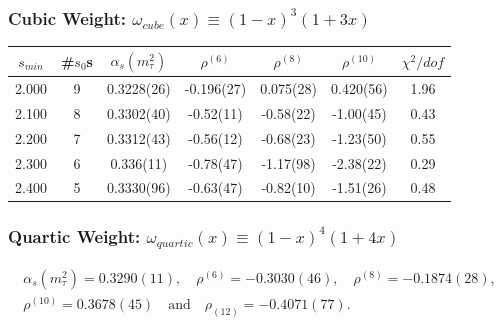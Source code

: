 \documentclass[fleqn]{beamer}
\begin{document}
\begin{frame}
  \frametitle{Cubic Weight: \(\omega_{cube}(x) \equiv (1-x)^3(1+3x)\)}
  \begin{tabular}{ccccccc}
    \toprule
    \(s_{min}\) & \#\(s_0\)s & \(\alpha_s(m_\tau^2)\) & \(\rho^{(6)}\) & \(\rho^{(8)}\) & \(\rho^{(10)}\) & \(\chi^2/dof\)  \\
    \midrule
    2.000 & 9 & 0.3228(26) & -0.196(27) & 0.075(28) & 0.420(56) & 1.96 \\
    \rowcolor{primary}
    2.100 & 8 & 0.3302(40) & -0.52(11) & -0.58(22) & -1.00(45) & 0.43 \\
    2.200 & 7 & 0.3312(43) & -0.56(12) & -0.68(23) & -1.23(50) & 0.55 \\
    2.300 & 6 & 0.336(11) & -0.78(47) & -1.17(98) & -2.38(22) & 0.29 \\
    2.400 & 5 & 0.3330(96) & -0.63(47) & -0.82(10) & -1.51(26) & 0.48 \\
    \bottomrule
  \end{tabular}
\end{frame}
\begin{frame}
  \frametitle{Quartic Weight:  \( \omega_{quartic}(x) \equiv (1-x)^4(1+4x)\)}
  \begin{equation}
    \begin{split}
      \alpha_s(m_\tau^2) = 0.3290(11), \quad \rho^{(6)}=-0.3030(46), \quad \rho^{(8)}=-0.1874(28), \\
      \rho^{(10)} = 0.3678(45) \quad \text{and} \quad \rho_{(12)}=-0.4071(77).
    \end{split}
  \end{equation}
\end{frame}
\end{document}
